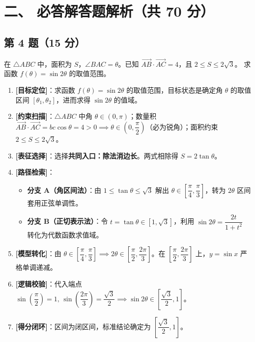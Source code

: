 \documentclass[11pt,a4paper,fontset=fandol]{ctexart}
\newcommand{\vect}[1]{\overrightarrow{#1}}
\begin{document}
\newpage
\section*{二、 必答解答题解析（共 70 分）}

\subsection*{第 4 题（15 分）}

\begin{problembox}
在 \(\triangle ABC\) 中，面积为 \(S\)，\(\angle BAC = \theta\)。已知 \(\vect{AB}\cdot\vect{AC} = 4\)，且 \(2 \le S \le 2\sqrt{3}\)。
求函数 \(f(\theta) = \sin 2\theta\) 的取值范围。
\end{problembox}

\medskip
\begin{tcolorbox}[colback=gray!4,colframe=ink!70,boxrule=0.7pt,arc=1mm,before skip=6pt,after skip=6pt,top=4pt,bottom=4pt,title=\textbf{决策路线}]
\begin{enumerate}[label=\textbf{\arabic*\ },leftmargin=1.8em]
  \item \textbf{[目标定位]}：求函数 \(f(\theta) = \sin 2\theta\) 的取值范围，目标状态是确定角 \(\theta\) 的取值区间 \([\theta_1, \theta_2]\)，进而求得 \(\sin 2\theta\) 的值域。
  \item \textbf{[约束扫描]}：\(\triangle ABC\) 中角 \(\theta \in (0, \pi)\)；数量积 \(\vect{AB}\cdot\vect{AC} = bc\cos\theta = 4 > 0 \implies \theta \in \left(0, \dfrac{\pi}{2}\right)\)（必为锐角）；面积约束 \(2 \le S \le 2\sqrt{3}\)。
  \item \textbf{[表征选择]}：选择\textbf{共同入口：除法消边长}。两式相除得 \(S = 2\tan\theta\)。
  \item \textbf{[路径检索]}：
    \begin{itemize}
      \item \textbf{分支 A（角区间法）}：由 \(1 \le \tan\theta \le \sqrt{3}\) 解出 \(\theta \in \left[\dfrac{\pi}{4}, \dfrac{\pi}{3}\right]\)，转为 \(2\theta\) 区间套用正弦单调性。
      \item \textbf{分支 B（正切表示法）}：令 \(t = \tan\theta \in [1, \sqrt{3}]\)，利用 \(\sin 2\theta = \dfrac{2t}{1+t^2}\) 转化为代数函数求值域。
    \end{itemize}
  \item \textbf{[模型转化]}：由 \(\theta \in \left[\dfrac{\pi}{4}, \dfrac{\pi}{3}\right] \implies 2\theta \in \left[\dfrac{\pi}{2}, \dfrac{2\pi}{3}\right]\)。在 \(\left[\dfrac{\pi}{2}, \dfrac{2\pi}{3}\right]\) 上，\(y = \sin x\) 严格单调递减。
  \item \textbf{[逻辑校验]}：代入端点 \(\sin\left(\dfrac{\pi}{2}\right) = 1, \, \sin\left(\dfrac{2\pi}{3}\right) = \dfrac{\sqrt{3}}{2} \implies \sin 2\theta \in \left[\dfrac{\sqrt{3}}{2}, 1\right]\)。
  \item \textbf{[得分闭环]}：区间为闭区间，标准结论确定为 \(\left[\dfrac{\sqrt{3}}{2}, 1\right]\)。
\end{enumerate}
\end{tcolorbox}
\end{document}
